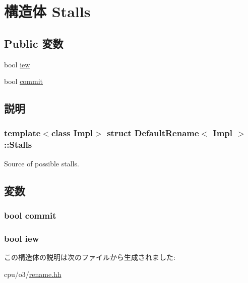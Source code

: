 \hypertarget{structDefaultRename_1_1Stalls}{
\section{構造体 Stalls}
\label{structDefaultRename_1_1Stalls}
}
\subsection*{Public 変数}
\begin{DoxyCompactItemize}
\item 
bool \hyperlink{structDefaultRename_1_1Stalls_a69f40ab12e9825ce316dfa72651a7404}{iew}
\item 
bool \hyperlink{structDefaultRename_1_1Stalls_ad7d6b839c43385b5fffdf2beaff214ec}{commit}
\end{DoxyCompactItemize}


\subsection{説明}
\subsubsection*{template$<$class Impl$>$ struct DefaultRename$<$ Impl $>$::Stalls}

Source of possible stalls. 

\subsection{変数}
\hypertarget{structDefaultRename_1_1Stalls_ad7d6b839c43385b5fffdf2beaff214ec}{
\subsubsection[{commit}]{\setlength{\rightskip}{0pt plus 5cm}bool {\bf commit}}}
\label{structDefaultRename_1_1Stalls_ad7d6b839c43385b5fffdf2beaff214ec}
\hypertarget{structDefaultRename_1_1Stalls_a69f40ab12e9825ce316dfa72651a7404}{
\subsubsection[{iew}]{\setlength{\rightskip}{0pt plus 5cm}bool {\bf iew}}}
\label{structDefaultRename_1_1Stalls_a69f40ab12e9825ce316dfa72651a7404}


この構造体の説明は次のファイルから生成されました:\begin{DoxyCompactItemize}
\item 
cpu/o3/\hyperlink{rename_8hh}{rename.hh}\end{DoxyCompactItemize}
